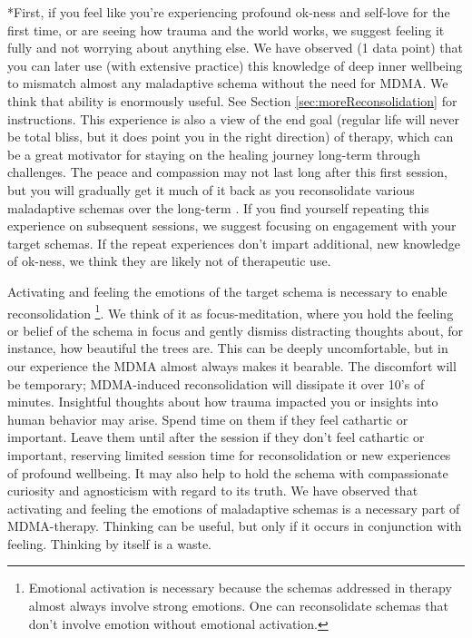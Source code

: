 \documentclass[12pt,letterpaper]{book}
\begin{document}
*First, if you feel like you're experiencing profound ok-ness and self-love for the first time, or are seeing how trauma and the world works, we suggest feeling it fully and not worrying about anything else. We have observed (1 data point) that you can later use (with extensive practice) this knowledge of deep inner wellbeing to mismatch almost any maladaptive schema without the need for MDMA. We think that ability is enormously useful. See Section \ref{sec:moreReconsolidation} for instructions. This experience is also a view of the end goal (regular life will never be total bliss, but it does point you in the right direction) of therapy, which can be a great motivator for staying on the healing journey long-term through challenges. The peace and compassion may not last long after this first session, but you will gradually get it much of it back as you reconsolidate various maladaptive schemas over the long-term \cite{evansAfterglow}. If you find yourself repeating this experience on subsequent sessions, we suggest focusing on engagement with your target schemas. If the repeat experiences don't impart additional, new knowledge of ok-ness, we think they are likely not of therapeutic use.


Activating and feeling the emotions of the target schema is necessary to enable reconsolidation \cite{ecker2015misunderstood} \footnote{Emotional activation is necessary because the schemas addressed in therapy almost always involve strong emotions. One can reconsolidate schemas that don't involve emotion without emotional activation.}. We think of it as focus-meditation, where you hold the feeling or belief of the schema in focus and gently dismiss distracting thoughts about, for instance, how beautiful the trees are. This can be deeply uncomfortable, but in our experience the MDMA almost always makes it bearable. The discomfort will be temporary; MDMA-induced reconsolidation will dissipate it over 10's of minutes. Insightful thoughts about how trauma impacted you or insights into human behavior may arise. Spend time on them if they feel cathartic or important. Leave them until after the session if they don't feel cathartic or important, reserving limited session time for reconsolidation or new experiences of profound wellbeing. It may also help to hold the schema with compassionate curiosity and agnosticism with regard to its truth. We have observed that activating and feeling the emotions of maladaptive schemas is a necessary part of MDMA-therapy. Thinking can be useful, but only if it occurs in conjunction with feeling. Thinking by itself is a waste.
\end{document}
